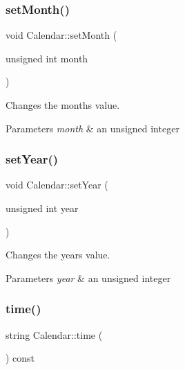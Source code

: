 \subsubsection{\texorpdfstring{set\+Month()}{setMonth()}}
{\footnotesize\ttfamily void Calendar\+::set\+Month (\begin{DoxyParamCaption}\item[{unsigned int}]{month }\end{DoxyParamCaption})}



Changes the month\textquotesingle{}s value. 


\begin{DoxyParams}{Parameters}
{\em month} & an unsigned integer \\
\hline
\end{DoxyParams}
\mbox{\label{class_calendar_a22194fd8dcdc4c083f7a870c8a476f75}} 
\subsubsection{\texorpdfstring{set\+Year()}{setYear()}}
{\footnotesize\ttfamily void Calendar\+::set\+Year (\begin{DoxyParamCaption}\item[{unsigned int}]{year }\end{DoxyParamCaption})}



Changes the year\textquotesingle{}s value. 


\begin{DoxyParams}{Parameters}
{\em year} & an unsigned integer \\
\hline
\end{DoxyParams}
\mbox{\label{class_calendar_ae8d5a30e386a154991cf0e32f7af4b2c}} 
\subsubsection{\texorpdfstring{time()}{time()}}
{\footnotesize\ttfamily string Calendar\+::time (\begin{DoxyParamCaption}{ }\end{DoxyParamCaption}) const}



